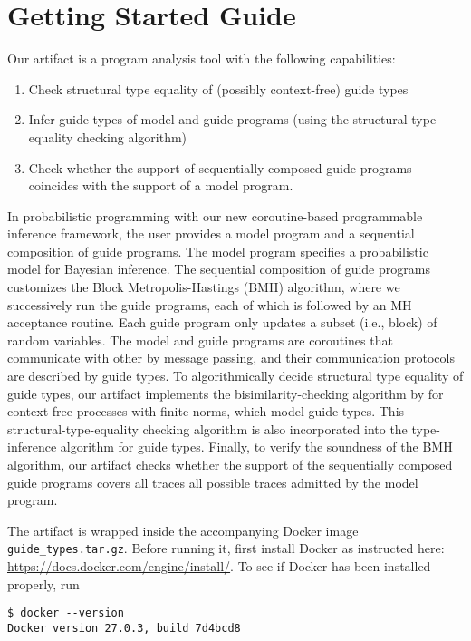 
\section{Getting Started Guide}

Our artifact is a program analysis tool with the following capabilities:
\begin{enumerate}
  \item Check structural type equality of (possibly context-free) guide types
  \item Infer guide types of model and guide programs (using the
  structural-type-equality checking algorithm)
  \item Check whether the support of sequentially composed guide programs
  coincides with the support of a model program.
\end{enumerate}

In probabilistic programming with our new coroutine-based
programmable inference framework, the user provides a model program and a
sequential composition of guide programs.
%
The model program specifies a probabilistic model for Bayesian inference.
%
The sequential composition of guide programs customizes the Block
Metropolis-Hastings (BMH) algorithm, where we successively run the guide
programs, each of which is followed by an MH acceptance routine.
%
Each guide program only updates a subset (i.e., block) of random variables.
%
The model and guide programs are coroutines that communicate with other by
message passing, and their communication protocols are described by guide types.
%
To algorithmically decide structural type equality of guide types, our artifact
implements the bisimilarity-checking algorithm by \citet{Hirshfeld1994} for
context-free processes with finite norms, which model guide types.
%
This structural-type-equality checking algorithm is also incorporated into the
type-inference algorithm for guide types.
%
Finally, to verify the soundness of the BMH algorithm, our artifact checks
whether the support of the sequentially composed guide programs covers all
traces all possible traces admitted by the model program.

The artifact is wrapped inside the accompanying Docker image
\texttt{guide\_types.tar.gz}.
%
Before running it, first install Docker as instructed here:
\url{https://docs.docker.com/engine/install/}.
%
To see if Docker has been installed properly, run
\begin{verbatim}
$ docker --version
Docker version 27.0.3, build 7d4bcd8
\end{verbatim}

